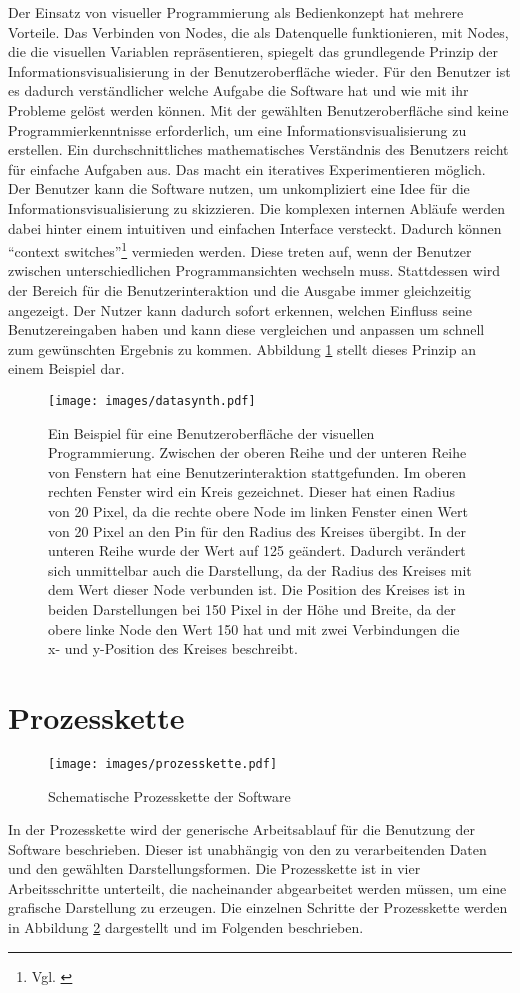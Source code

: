 \documentclass[a4paper, 
               12pt,
               DIV=calc,
               version=first,
               pdftex,
               headsepline,
               footsepline,
               bibtotocnumbered,
               liststotocnumbered]{scrreprt}
\begin{document}
Der Einsatz von visueller Programmierung als Bedienkonzept hat
mehrere Vorteile. Das Verbinden von Nodes, die als Datenquelle funktionieren, mit Nodes, die
die visuellen Variablen repräsentieren, spiegelt das grundlegende
Prinzip der Informationsvisualisierung in der Benutzeroberfläche wieder. Für den Benutzer ist
es dadurch verständlicher welche Aufgabe die Software hat und wie mit ihr Probleme gelöst
werden können.
Mit der gewählten Benutzeroberfläche sind keine Programmierkenntnisse erforderlich, um eine Informationsvisualisierung
zu erstellen. Ein durchschnittliches mathematisches Verständnis des Benutzers reicht für einfache Aufgaben aus.
Das macht ein iteratives Experimentieren möglich. Der Benutzer kann die Software nutzen, um unkompliziert eine
Idee für die Informationsvisualisierung zu skizzieren.
Die komplexen internen Abläufe werden dabei hinter einem intuitiven und einfachen Interface
versteckt. Dadurch können "`context switches"'\footnote{Vgl. \citep[S.\,50]{Tufte}}
vermieden werden. Diese treten auf, wenn der Benutzer zwischen unterschiedlichen Programmansichten wechseln
muss. Stattdessen wird der Bereich für die Benutzerinteraktion und die Ausgabe
immer gleichzeitig angezeigt. Der Nutzer kann dadurch sofort erkennen, welchen Einfluss seine Benutzereingaben haben und
kann diese vergleichen und anpassen um schnell zum gewünschten Ergebnis zu kommen.
Abbildung \ref{fig:datasynth} stellt dieses Prinzip an einem Beispiel dar.
\begin{figure}
\centering
\texttt{[image: images/datasynth.pdf]}
\caption{Ein Beispiel für eine Benutzeroberfläche der visuellen Programmierung. Zwischen der oberen Reihe
und der unteren Reihe von Fenstern hat eine Benutzerinteraktion stattgefunden.
Im oberen rechten Fenster wird ein Kreis gezeichnet. Dieser hat einen Radius von 20 Pixel, da
die rechte obere Node im linken Fenster einen Wert von 20 Pixel an den Pin für den Radius des Kreises übergibt.
In der unteren Reihe wurde der Wert auf 125 geändert. Dadurch verändert sich unmittelbar
auch die Darstellung, da der Radius des Kreises mit dem Wert dieser Node verbunden ist. Die Position
des Kreises ist in beiden Darstellungen bei 150 Pixel in der Höhe und Breite, da der obere linke Node den Wert 150 hat und mit
zwei Verbindungen die x- und y-Position des Kreises beschreibt.}
\label{fig:datasynth}
\end{figure}

\section{Prozesskette}
\begin{figure}
\centering
\texttt{[image: images/prozesskette.pdf]}
\caption{Schematische Prozesskette der Software}
\label{fig:prozesskette}
\end{figure}
In der Prozesskette wird der generische Arbeitsablauf für die Benutzung
der Software beschrieben. Dieser ist unabhängig von den zu verarbeitenden Daten
und den gewählten Darstellungsformen. Die Prozesskette ist in vier
Arbeitsschritte unterteilt, die nacheinander abgearbeitet werden müssen,
um eine grafische Darstellung zu erzeugen.
Die einzelnen Schritte der Prozesskette werden in Abbildung \ref{fig:prozesskette} dargestellt und im
Folgenden beschrieben.
\end{document}

